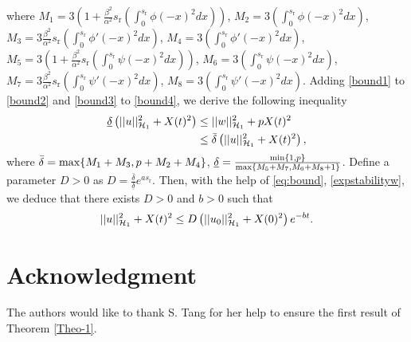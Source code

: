 \documentclass[journal]{IEEEtran}
\begin{document}
where $M_1 = 3\left(1+\frac{\beta^2}{\alpha^2} s_{{\mathrm r}} \left( \int_{0}^{s_{{\mathrm r}}} \phi(-x)^2 dx\right)\right)$, $M_2 =  3 \left( \int_{0}^{s_{{\mathrm r}}} \phi(-x)^2 dx \right)$, $M_3 =  3\frac{\beta^2}{\alpha^2} s_{{\mathrm r}} \left( \int_{0}^{s_{{\mathrm r}}} \phi'(-x)^2 dx\right)$, $M_4 = 3 \left( \int_{0}^{s_{{\mathrm r}}} \phi'(-x)^2 dx \right)$, $M_5 = 3\left(1+\frac{\beta^2}{\alpha^2} s_{{\mathrm r}} \left( \int_{0}^{s_{{\mathrm r}}} \psi(-x)^2 dx\right)\right)$, $M_6 = 3 \left( \int_{0}^{s_{{\mathrm r}}} \psi(-x)^2 dx \right)$, $M_7 = 3\frac{\beta^2}{\alpha^2} s_{{\mathrm r}} \left( \int_{0}^{s_{{\mathrm r}}} \psi'(-x)^2 dx\right)$, $M_8 = 3 \left( \int_{0}^{s_{{\mathrm r}}} \psi'(-x)^2 dx \right)$.
Adding \eqref{bound1} to \eqref{bound2} and \eqref{bound3} to \eqref{bound4}, we derive the following inequality
\begin{align}\label{eq:bound}
\underline{\delta}\left(||u||_{{\cal H}_1}^2+X(t)^2\right)&\leq||w||_{{\cal H}_1}^2 +pX(t)^2\notag\\
&\leq \bar{\delta}\left(||u||_{{\cal H}_1}^2+X(t)^2\right),
\end{align}
where $\bar{\delta}={\rm max}\{M_1+M_3, p+M_2+M_4\}$, $\underline{\delta}=\frac{{\rm min}\left\{1,p\right\}}{{\rm max}\left\{M_5+M_7, M_6+M_8+1\right\}}$. Define a parameter $D>0$ as $D=\frac{\bar{\delta}}{\underline{\delta}}e^{as_{{\mathrm r}}}$. Then, with the help of \eqref{eq:bound}, \eqref{expstabilityw}, we deduce that there exists $D>0$ and $b>0$ such that
\begin{align}
||u||_{{\cal H}_1}^2+X(t)^2 \leq D \left(||u_0||_{{\cal H}_1}^2+X(0)^2\right) e^{-bt}.
\end{align}

\section*{Acknowledgment}

The authors would like to thank S. Tang for her help to ensure the first result of Theorem \ref{Theo-1}. 

\ifCLASSOPTIONcaptionsoff
  \newpage
\fi
\end{document}
